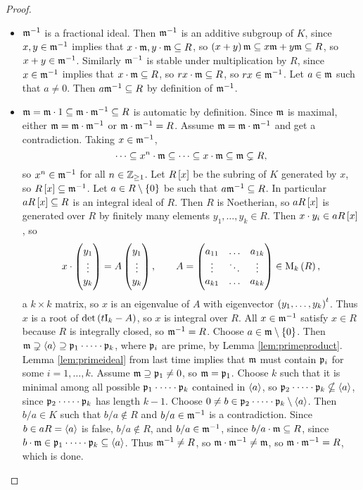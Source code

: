 \begin{proof}
\hfill
\begin{itemize}
\item $ \mathfrak{m}^{-1} $ is a fractional ideal. Then $ \mathfrak{m}^{-1} $ is an additive subgroup of $ K $, since $ x, y \in \mathfrak{m}^{-1} $ implies that $ x \cdot \mathfrak{m}, y \cdot \mathfrak{m} \subseteq R $, so $ \br{x + y}\mmm \subseteq x\mmm + y\mmm \subseteq R $, so $ x + y \in \mathfrak{m}^{-1} $. Similarly $ \mathfrak{m}^{-1} $ is stable under multiplication by $ R $, since $ x \in \mathfrak{m}^{-1} $ implies that $ x \cdot \mathfrak{m} \subseteq R $, so $ rx \cdot \mathfrak{m} \subseteq R $, so $ rx \in \mathfrak{m}^{-1} $. Let $ a \in \mathfrak{m} $ such that $ a \ne 0 $. Then $ a\mathfrak{m}^{-1} \subseteq R $ by definition of $ \mathfrak{m}^{-1} $.
\item $ \mathfrak{m} = \mathfrak{m} \cdot 1 \subseteq \mathfrak{m} \cdot \mathfrak{m}^{-1} \subseteq R $ is automatic by definition. Since $ \mathfrak{m} $ is maximal, either $ \mathfrak{m} = \mathfrak{m} \cdot \mathfrak{m}^{-1} $ or $ \mathfrak{m} \cdot \mathfrak{m}^{-1} = R $. Assume $ \mathfrak{m} = \mathfrak{m} \cdot \mathfrak{m}^{-1} $ and get a contradiction. Taking $ x \in \mathfrak{m}^{-1} $,
$$ \dots \subseteq x^n \cdot \mathfrak{m} \subseteq \dots \subseteq x \cdot \mathfrak{m} \subseteq \mathfrak{m} \subsetneq R, $$
so $ x^n \in \mathfrak{m}^{-1} $ for all $ n \in \mathbb{Z}_{\ge 1} $. Let $ R\sbr{x} $ be the subring of $ K $ generated by $ x $, so $ R\sbr{x} \subseteq \mmm^{-1} $. Let $ a \in R \setminus \cbr{0} $ be such that $ a\mathfrak{m}^{-1} \subseteq R $. In particular $ aR\sbr{x} \subseteq R $ is an integral ideal of $ R $. Then $ R $ is Noetherian, so $ aR\sbr{x} $ is generated over $ R $ by finitely many elements $ y_1, \dots, y_k \in R $. Then $ x \cdot y_i \in aR\sbr{x} $, so
$$ x \cdot \threebyone{y_1}{\vdots}{y_k} = A\threebyone{y_1}{\vdots}{y_k}, \qquad A = \threebythree{a_{11}}{\dots}{a_{1k}}{\vdots}{\ddots}{\vdots}{a_{k1}}{\dots}{a_{kk}} \in \M_k\br{R}, $$
a $ k \times k $ matrix, so $ x $ is an eigenvalue of $ A $ with eigenvector $ \br{y_1, \dots, y_k}^t $. Thus $ x $ is a root of $ \det \br{t\I_k - A} $, so $ x $ is integral over $ R $. All $ x \in \mathfrak{m}^{-1} $ satisfy $ x \in R $ because $ R $ is integrally closed, so $ \mathfrak{m}^{-1} = R $. Choose $ a \in \mmm \setminus \cbr{0} $. Then $ \mathfrak{m} \supsetneq \left\langle a \right\rangle \supseteq \mathfrak{p}_1 \cdot \dots \cdot \mathfrak{p}_k $, where $ \mathfrak{p}_i $ are prime, by Lemma \ref{lem:primeproduct}. Lemma \ref{lem:primeideal} from last time implies that $ \mathfrak{m} $ must contain $ \mathfrak{p}_i $ for some $ i = 1, \dots, k $. Assume $ \mathfrak{m} \supseteq \mathfrak{p}_1 \ne 0 $, so $ \mathfrak{m} = \mathfrak{p}_1 $. Choose $ k $ such that it is minimal among all possible $ \mathfrak{p}_1 \cdot \dots \cdot \mathfrak{p}_k $ contained in $ \left\langle a \right\rangle $, so $ \mathfrak{p}_2 \cdot \dots \cdot \mathfrak{p}_k \nsubseteq \left\langle a \right\rangle $, since $ \mathfrak{p}_2 \cdot \dots \cdot \mathfrak{p}_k $ has length $ k - 1 $. Choose $ 0 \ne b \in \mathfrak{p}_2 \cdot \dots \cdot \mathfrak{p}_k \setminus \left\langle a \right\rangle $. Then $ b / a \in K $ such that $ b / a \notin R $ and $ b / a \in \mathfrak{m}^{-1} $ is a contradiction. Since $ b \in aR = \left\langle a \right\rangle $ is false, $ b / a \notin R $, and $ b / a \in \mathfrak{m}^{-1} $, since $ b / a \cdot \mathfrak{m} \subseteq R $, since $ b \cdot \mathfrak{m} \in \mathfrak{p}_1 \cdot \dots \cdot \mathfrak{p}_k \subseteq \left\langle a \right\rangle $. Thus $ \mathfrak{m}^{-1} \ne R $, so $ \mathfrak{m} \cdot \mathfrak{m}^{-1} \ne \mathfrak{m} $, so $ \mathfrak{m} \cdot \mathfrak{m}^{-1} = R $, which is done.
\end{itemize}
\end{proof}


